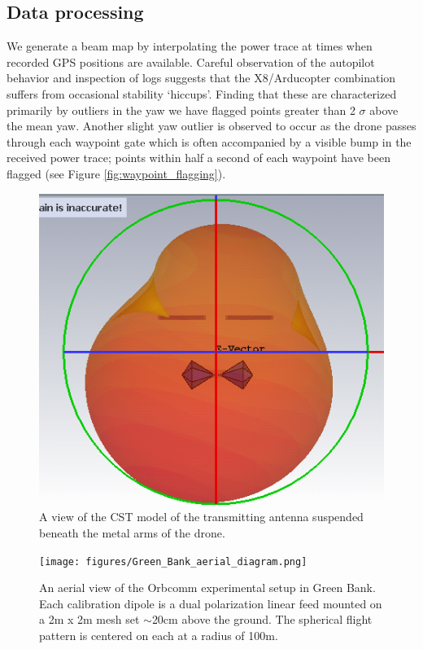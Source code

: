 \documentclass[preprint2,numberedappendix,tighten,twocolappendix]{aastex6}
\begin{document}
\subsection{Data processing}
\label{sec:processing}
We generate a beam map by interpolating the power trace at times when recorded GPS positions are available.  Careful observation of the autopilot behavior and inspection of logs suggests that the X8/Arducopter combination suffers from occasional stability `hiccups'. Finding that these are characterized primarily by outliers in the yaw we have flagged points greater than 2 $\sigma$ above the mean yaw.  Another slight yaw outlier is observed to occur as the drone passes through each waypoint gate which is often accompanied by a visible bump in the received power trace; points within half a second of each waypoint have been flagged (see Figure \ref{fig:waypoint_flagging}).

\begin{figure}
\includegraphics[width=\columnwidth]{figures/ECHO_CST.png}
\caption{A view of the CST model of the transmitting antenna suspended beneath the metal arms of the drone.}\label{fig:tx_cst}
\end{figure}




\begin{figure}
\begin{center}
\texttt{[image: figures/Green\_Bank\_aerial\_diagram.png]}
\caption{An aerial view of the Orbcomm experimental setup in Green Bank. Each calibration dipole is a dual polarization linear feed mounted on a 2m x 2m mesh set $\sim$20cm above the ground. The spherical flight pattern is centered on each at a radius of 100m.}
\label{fig:GB_aerial}
\end{center}
\end{figure}
\end{document}
